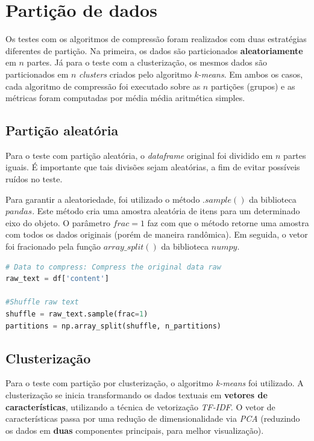 \section{Partição de dados}
Os testes com os algoritmos de compressão foram realizados com duas estratégias diferentes de partição.
Na primeira, os dados são particionados \textbf{aleatoriamente} em $n$ partes.
Já para o teste com a clusterização, os mesmos dados são particionados em $n$ \emph{clusters} criados pelo algoritmo \emph{k-means}.
Em ambos os casos, cada algoritmo de compressão foi executado sobre as $n$ partições (grupos) e as métricas foram computadas por média média aritmética simples.

\subsection{Partição aleatória} \label{ssec:randomp}
Para o teste com partição aleatória, o \emph{dataframe} original foi dividido em $n$ partes iguais.
É importante que tais divisões sejam aleatórias, a fim de evitar possíveis ruídos no teste.

Para garantir a aleatoriedade, foi utilizado o método $.sample()$ da biblioteca $pandas$. 
Este método cria uma amostra aleatória de itens para um determinado eixo do objeto. 
O parâmetro $frac=1$ faz com que o método retorne uma amostra com todos os dados originais (porém de maneira randômica).
Em seguida, o vetor foi fracionado pela função $array\_split()$ da biblioteca $numpy$.

\begin{lstlisting}[language=Python, caption=Partição aleatória de dados]
# Data to compress: Compress the original data raw
raw_text = df['content']

#Shuffle raw text
shuffle = raw_text.sample(frac=1)
partitions = np.array_split(shuffle, n_partitions)
\end{lstlisting}

\subsection{Clusterização}
Para o teste com partição por clusterização, o algoritmo \emph{k-means} foi utilizado.
A clusterização se inicia transformando os dados textuais em \textbf{vetores de características}, utilizando a técnica de vetorização \emph{TF-IDF}. 
O vetor de características passa por uma redução de dimensionalidade via \emph{PCA} (reduzindo os dados em \textbf{duas} componentes principais, para melhor visualização).

